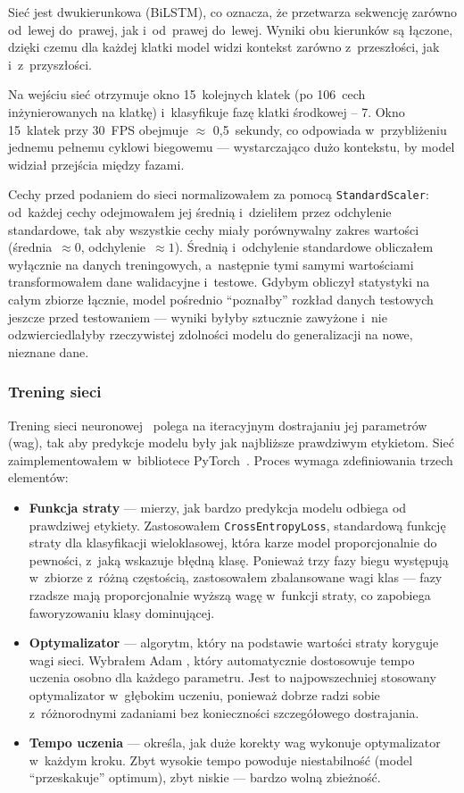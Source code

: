 Sieć jest dwukierunkowa (BiLSTM), co oznacza, że przetwarza sekwencję zarówno od~lewej do~prawej, jak i~od~prawej do~lewej. Wyniki obu kierunków są łączone, dzięki czemu dla każdej klatki model widzi kontekst zarówno z~przeszłości, jak i~z~przyszłości.

Na wejściu sieć otrzymuje okno 15~kolejnych klatek (po 106~cech inżynierowanych na klatkę) i~klasyfikuje fazę klatki środkowej -- 7. Okno 15~klatek przy 30~FPS obejmuje $\approx$ 0{,}5~sekundy, co odpowiada w~przybliżeniu jednemu pełnemu cyklowi biegowemu --- wystarczająco dużo kontekstu, by model widział przejścia między fazami. 

Cechy przed podaniem do sieci normalizowałem za pomocą \texttt{StandardScaler}: od~każdej cechy odejmowałem jej średnią i~dzieliłem przez odchylenie standardowe, tak aby wszystkie cechy miały porównywalny zakres wartości (średnia~$\approx 0$, odchylenie~$\approx 1$). Średnią i~odchylenie standardowe obliczałem wyłącznie na danych treningowych, a~następnie tymi samymi wartościami transformowałem dane walidacyjne i~testowe. Gdybym obliczył statystyki na całym zbiorze łącznie, model pośrednio ``poznałby'' rozkład danych testowych jeszcze przed testowaniem --- wyniki byłyby sztucznie zawyżone i~nie odzwierciedlałyby rzeczywistej zdolności modelu do generalizacji na nowe, nieznane dane. 

\subsubsection{Trening sieci}

Trening sieci neuronowej~\cite{goodfellow2016deep} polega na iteracyjnym dostrajaniu jej parametrów (wag), tak aby predykcje modelu były jak najbliższe prawdziwym etykietom. Sieć zaimplementowałem w~bibliotece PyTorch~\cite{pytorch}. Proces wymaga zdefiniowania trzech elementów:

\begin{itemize}
    \item \textbf{Funkcja straty} --- mierzy, jak bardzo predykcja modelu odbiega od prawdziwej etykiety. Zastosowałem \texttt{CrossEntropyLoss}, standardową funkcję straty dla klasyfikacji wieloklasowej, która karze model proporcjonalnie do pewności, z~jaką wskazuje błędną klasę. Ponieważ trzy fazy biegu występują w~zbiorze z~różną częstością, zastosowałem zbalansowane wagi klas --- fazy rzadsze mają proporcjonalnie wyższą wagę w~funkcji straty, co zapobiega faworyzowaniu klasy dominującej.
    \item \textbf{Optymalizator} --- algorytm, który na podstawie wartości straty koryguje wagi sieci. Wybrałem Adam \cite{kingma2015adam}, który automatycznie dostosowuje tempo uczenia osobno dla każdego parametru. Jest to najpowszechniej stosowany optymalizator w~głębokim uczeniu, ponieważ dobrze radzi sobie z~różnorodnymi zadaniami bez konieczności szczegółowego dostrajania.
    \item \textbf{Tempo uczenia} --- określa, jak duże korekty wag wykonuje optymalizator w~każdym kroku. Zbyt wysokie tempo powoduje niestabilność (model ``przeskakuje'' optimum), zbyt niskie --- bardzo wolną zbieżność.
\end{itemize}

